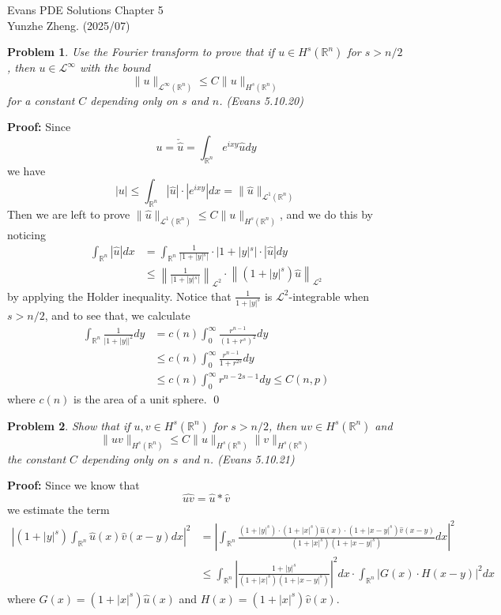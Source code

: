 \documentclass[12pt]{article}
\newtheorem{problem}{Problem}
\begin{document}
\noindent Evans PDE Solutions \hfill Chapter 5\\
Yunzhe Zheng. (2025/07)

\hrulefill

\begin{problem}
Use the Fourier transform to prove that if $u\in H^s(\mathbb{R}^n)$ for $s>n/2$, then $u\in\mathscr{L}^\infty$ with the bound 
$$
\|u\|_{\mathscr{L}^\infty(\mathbb{R}^n)}\leq C\|u\|_{H^s(\mathbb{R}^n)}
$$
for a constant $C$ depending only on $s$ and $n$. (Evans 5.10.20)
\end{problem}

\textbf{Proof:} Since 
$$
u=\check{\hat{u}}=\int_{\mathbb{R}^n}e^{ixy}\hat{u}dy
$$
we have 
$$
|u|\leq \int_{\mathbb{R}^n}|\hat{u}|\cdot|e^{ixy}|dx=\|\hat{u}\|_{\mathscr{L}^1(\mathbb{R}^n)}
$$
Then we are left to prove $\|\hat{u}\|_{\mathscr{L}^1(\mathbb{R}^n)}\leq C\|u\|_{H^s(\mathbb{R}^n)}$, and we do this by noticing
\begin{align*}
    \int_{\mathbb{R}^n}|\hat{u}|dx&=\int_{\mathbb{R}^n}\frac{1}{|1+|y|^s|}\cdot|1+|y|^s|\cdot|\hat{u}|dy \\
    &\leq \left\|\frac{1}{|1+|y|^s|}\right\|_{\mathscr{L}^2}\cdot\left\|(1+|y|^s)\hat{u}\right\|_{\mathscr{L}^2}
\end{align*}
by applying the Holder inequality. Notice that $\frac{1}{1+|y|^s}$ is $\mathscr{L}^2$-integrable when $s>n/2$, and to see that, we calculate
\begin{align*}
    \int_{\mathbb{R}^n}\frac{1}{|1+|y||^2}dy&=c(n)\int_0^\infty\frac{r^{n-1}}{(1+r^s)^2}dy \\
    &\leq c(n)\int_{0}^{\infty}\frac{r^{n-1}}{1+r^{2s}}dy \\
    &\leq c(n)\int_0^\infty r^{n-2s-1}dy \leq C(n, p)
\end{align*}
where $c(n)$ is the area of a unit sphere. \qed
\\
\begin{problem}
Show that if $u, v\in H^s(\mathbb{R}^n)$ for $s>n/2$, then $uv\in H^s(\mathbb{R}^n)$ and 
$$
\|uv\|_{H^s(\mathbb{R}^n)}\leq C\|u\|_{H^s(\mathbb{R}^n)}\|v\|_{H^s(\mathbb{R}^n)}
$$
the constant $C$ depending only on $s$ and $n$. (Evans 5.10.21)
\end{problem}

\textbf{Proof:} Since we know that 
$$
\widehat{uv}=\hat{u}*\hat{v}
$$
we estimate the term
\begin{align*}
    \left|(1+|y|^s)\int_{\mathbb{R}^n}\hat{u}(x)\hat{v}(x-y)dx\right|^2&=\left|\int_{\mathbb{R}^n}\frac{(1+|y|^s)\cdot(1+|x|^s)\hat{u}(x)\cdot(1+|x-y|^s)\hat{v}(x-y)}{(1+|x|^s)(1+|x-y|^s)}dx\right|^2 \\
    &\leq \int_{\mathbb{R}^n}\left|\frac{1+|y|^s}{(1+|x|^s)(1+|x-y|^s)}\right|^2dx\cdot\int_{\mathbb{R}^n}\left|G(x)\cdot H(x-y)\right|^2dx
\end{align*}
where $G(x)=(1+|x|^s)\hat{u}(x)$ and $H(x)=(1+|x|^s)\hat{v}(x)$.
\end{document}
